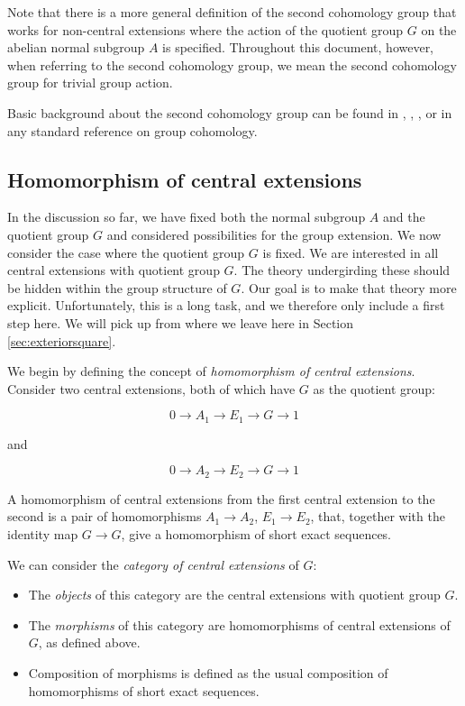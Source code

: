\documentclass{ucetd}
\begin{document}
Note that there is a more general definition of the second cohomology
group that works for non-central extensions where the action of the
quotient group $G$ on the abelian normal subgroup $A$ is
specified. Throughout this document, however, when referring to the
second cohomology group, we mean the second cohomology group for
trivial group action.

Basic background about the second cohomology group can be found in
\cite{Baer38}, \cite{Karpilovsky}, \cite{DummitFoote}, or in any
standard reference on group cohomology.

\subsection{Homomorphism of central extensions}\label{sec:homomorphism-central-extensions}

In the discussion so far, we have fixed both the normal subgroup $A$
and the quotient group $G$ and considered possibilities for the group
extension. We now consider the case where the quotient group $G$ is
fixed. We are interested in all central extensions with quotient group
$G$. The theory undergirding these should be hidden within the group
structure of $G$. Our goal is to make that theory more
explicit. Unfortunately, this is a long task, and we therefore only
include a first step here. We will pick up from where we leave here in
Section \ref{sec:exteriorsquare}.

We begin by defining the concept of {\em homomorphism of central
  extensions}. Consider two central extensions, both of which have $G$
as the quotient group:

$$0 \to A_1 \to E_1 \to G \to 1$$

and

$$0 \to A_2 \to E_2 \to G \to 1$$

A homomorphism of central extensions from the first central extension
to the second is a pair of homomorphisms $A_1 \to A_2$, $E_1 \to E_2$,
that, together with the identity map $G \to G$, give a homomorphism of
short exact sequences.

We can consider the {\em category of central extensions} of $G$:

\begin{itemize}
\item The {\em objects} of this category are the central extensions with quotient group $G$.
\item The {\em morphisms} of this category are homomorphisms of
  central extensions of $G$, as defined above.
\item Composition of morphisms is defined as the usual composition of
  homomorphisms of short exact sequences.
\end{itemize}
\end{document}
